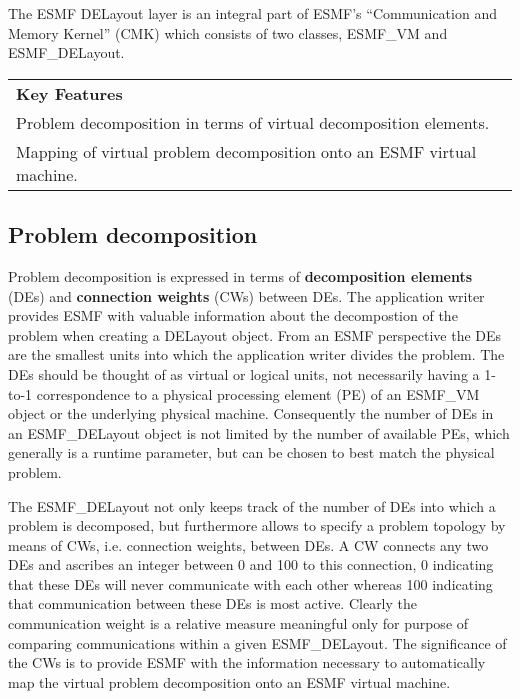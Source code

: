 
The ESMF DELayout layer is an integral part of ESMF's ``Communication and Memory Kernel'' (CMK) which consists of two classes, ESMF\_VM and ESMF\_DELayout.
\begin{center}  
\begin{tabular}{|p{6in}|}
\hline
\vspace{.01in}
{\bf Key Features} \\[.01in]
Problem decomposition in terms of virtual decomposition elements.\\
Mapping of virtual problem decomposition onto an ESMF virtual machine.\\[.03in] \hline
\end{tabular}
\end{center}

\subsection{Problem decomposition}
Problem decomposition is expressed in terms of {\bf decomposition elements} (DEs) and {\bf connection weights} (CWs) between DEs. The application writer provides ESMF with valuable information about the decompostion of the problem when creating a DELayout object. From an ESMF perspective the DEs are the smallest units into which the application writer divides the problem. The DEs should be thought of as virtual or logical units, not necessarily having a 1-to-1 correspondence to a physical processing element (PE) of an ESMF\_VM object or the underlying physical machine. Consequently the number of DEs in an ESMF\_DELayout object is not limited by the number of available PEs, which generally is a runtime parameter, but can be chosen to best match the physical problem.

The ESMF\_DELayout not only keeps track of the number of DEs into which a problem is decomposed, but furthermore allows to specify a problem topology by means of CWs, i.e. connection weights, between DEs. A CW connects any two DEs and ascribes an integer between 0 and 100 to this connection, 0 indicating that these DEs will never communicate with each other whereas 100 indicating that communication between these DEs is most active. Clearly the communication weight is a relative measure meaningful only for purpose of comparing communications within a given ESMF\_DELayout. The significance of the CWs is to provide ESMF with the information necessary to automatically map the virtual problem decomposition onto an ESMF virtual machine.

